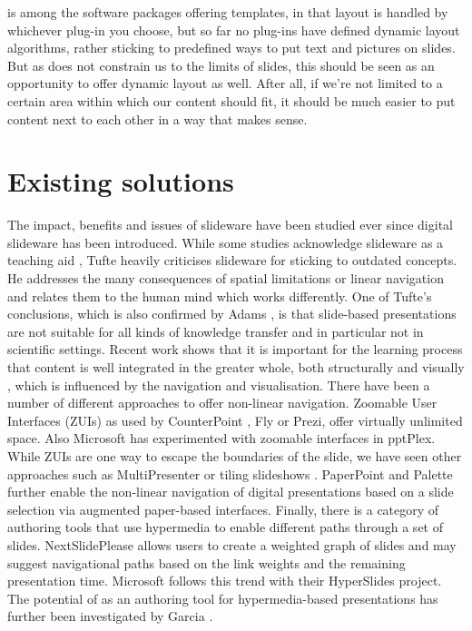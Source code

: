    \mxp is among the software packages offering templates, in that layout is
   handled by whichever plug-in you choose, but so far no plug-ins have defined
   dynamic layout algorithms, rather sticking to predefined ways to put text
   and pictures on slides. But as \mxp does not constrain us to the limits of
   slides, this should be seen as an opportunity to offer dynamic layout as
   well. After all, if we're not limited to a certain area within which our
   content should fit, it should be much easier to put content next to each
   other in a way that makes sense.

  \section{Existing solutions}

   The impact, benefits and issues of slideware have been studied ever since
   digital slideware has been introduced. While some studies acknowledge
   slideware as a teaching aid \citep{holzinger-1}, Tufte \citep{tufte-1}
   heavily criticises slideware for sticking to outdated concepts. He addresses
   the many consequences of spatial limitations or linear navigation and
   relates them to the human mind which works differently. One of Tufte's
   conclusions, which is also confirmed by Adams \citep{adams-1}, is that
   slide-based presentations are not suitable for all kinds of knowledge
   transfer and in particular not in scientific settings. Recent work shows
   that it is important for the learning process that content is well
   integrated in the greater whole, both structurally and visually
   \citep{gross-1}, which is influenced by the navigation and visualisation.
   There have been a number of different approaches to offer non-linear
   navigation. Zoomable User Interfaces (ZUIs) as used by CounterPoint
   \citep{good-1}, Fly \citep{lichtschlag-1} or Prezi, offer virtually
   unlimited space. Also Microsoft has experimented with zoomable interfaces in
   pptPlex. While ZUIs are one way to escape the boundaries of the slide, we
   have seen other approaches such as MultiPresenter \citep{lanir-1} or tiling
   slideshows \citep{chen-1}. PaperPoint \citep{signer-1} and Palette
   \citep{nelson-2} further enable the non-linear navigation of digital
   presentations based on a slide selection via augmented paper-based
   interfaces. Finally, there is a category of authoring tools that use
   hypermedia to enable different paths through a set of slides.
   NextSlidePlease \citep{spicer-1} allows users to create a weighted graph of
   slides and may suggest navigational paths based on the link weights and the
   remaining presentation time. Microsoft follows this trend with their
   HyperSlides \citep{edge-1} project. The potential of \ppt* as an authoring
   tool for hypermedia-based presentations has further been investigated by
   Garcia \citep{garcia-1}.

